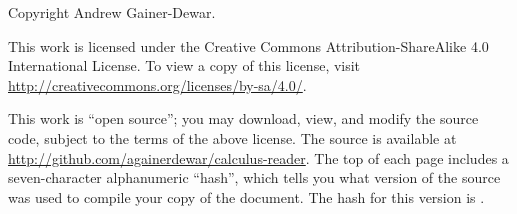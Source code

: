 \documentclass[../book/calcnotes.tex]{subfiles}
\begin{document}
\thispagestyle{empty}


\noindent
Copyright  Andrew Gainer-Dewar.

\vspace*{1cm}

\noindent
This work is licensed under the Creative Commons Attribution-ShareAlike 4.0 International License.
To view a copy of this license, visit \url{http://creativecommons.org/licenses/by-sa/4.0/}.

\noindent
This work is \enquote{open source}; you may download, view, and modify the source code, subject to the terms of the above license.
The source is available at \url{http://github.com/againerdewar/calculus-reader}.
The top of each page includes a seven-character alphanumeric \enquote{hash}, which tells you what version of the source was used to compile your copy of the document.
The hash for this version is \hashurl.
\end{document}
